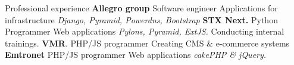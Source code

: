 \begin{rubric}{Professional experience}
\entry*[X 2013 -- obecnie]\textbf{Allegro group}\newline
    Software engineer\newline
    Applications for infrastructure\newline
    \textit{Django, Pyramid, Powerdns, Bootstrap}
\entry*[V 2011 -- IX 2013]\textbf{STX Next.}\newline
    Python Programmer\newline
    Web applications \newline
    \textit{Pylons, Pyramid, ExtJS.}\newline
    Conducting internal trainings.
\entry*[XII 2009 -- IV 2011]\textbf{VMR}.\newline
    PHP/JS programmer\newline
    Creating CMS \& \hbox{e-commerce} systems
\entry*[VI 2009 -- XII 2009]\textbf{Emtronet}\newline
    PHP/JS programmer\newline
    Web applications\newline
    \textit{cakePHP \& jQuery.}
\end{rubric}
